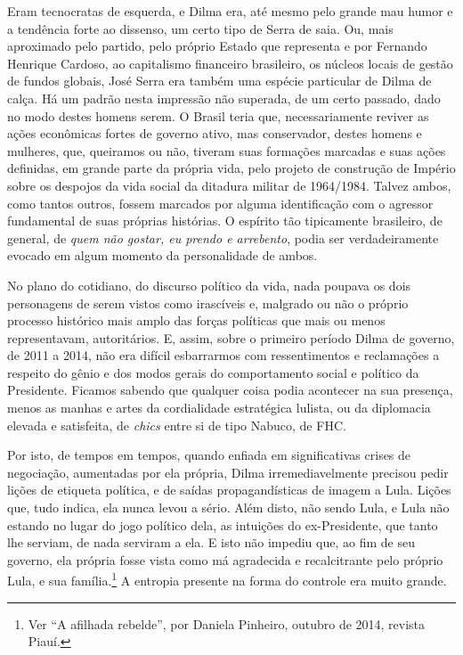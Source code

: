 Eram tecnocratas de esquerda, e Dilma era, até mesmo pelo grande mau
humor e a tendência forte ao dissenso, um certo tipo de Serra de saia.
Ou, mais aproximado pelo partido, pelo próprio Estado que representa e
por Fernando Henrique Cardoso, ao capitalismo financeiro brasileiro, os
núcleos locais de gestão de fundos globais, José Serra era também uma
espécie particular de Dilma de calça. Há um padrão nesta impressão não
superada, de um certo passado, dado no modo destes homens serem. O
Brasil teria que, necessariamente reviver as ações econômicas fortes de
governo ativo, mas conservador, destes homens e mulheres, que, queiramos
ou não, tiveram suas formações marcadas e suas ações definidas, em
grande parte da própria vida, pelo projeto de construção de Império
sobre os despojos da vida social da ditadura militar de 1964/1984.
Talvez ambos, como tantos outros, fossem marcados por alguma
identificação com o agressor fundamental de suas próprias histórias. O
espírito tão tipicamente brasileiro, de general, de \emph{quem não
gostar, eu prendo e arrebento}, podia ser verdadeiramente evocado em
algum momento da personalidade de ambos.

No plano do cotidiano, do discurso político da vida, nada poupava os
dois personagens de serem vistos como irascíveis e, malgrado ou não o
próprio processo histórico mais amplo das forças políticas que mais ou
menos representavam, autoritários. E, assim, sobre o primeiro período
Dilma de governo, de 2011 a 2014, não era difícil esbarrarmos com
ressentimentos e reclamações a respeito do gênio e dos modos gerais do
comportamento social e político da Presidente. Ficamos sabendo que
qualquer coisa podia acontecer na sua presença, menos as manhas e artes
da cordialidade estratégica lulista, ou da diplomacia elevada e
satisfeita, de \emph{chics} entre si de tipo Nabuco, de FHC.

Por isto, de tempos em tempos, quando enfiada em significativas crises
de negociação, aumentadas por ela própria, Dilma irremediavelmente
precisou pedir lições de etiqueta política, e de saídas propagandísticas
de imagem a Lula. Lições que, tudo indica, ela nunca levou a sério. Além
disto, não sendo Lula, e Lula não estando no lugar do jogo político
dela, as intuições do ex-Presidente, que tanto lhe serviam, de nada
serviram a ela. E isto não impediu que, ao fim de seu governo, ela
própria fosse vista como má agradecida e recalcitrante pelo próprio
Lula, e sua família.\footnote{Ver ``A afilhada rebelde'', por Daniela
  Pinheiro, outubro de 2014, revista
  Piauí.} A entropia presente na forma do
controle era muito grande.

